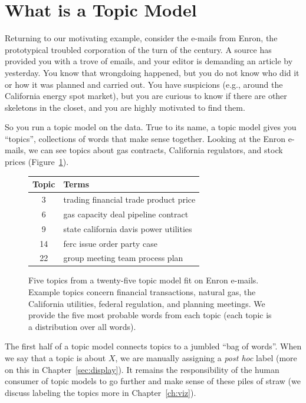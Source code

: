 \section{What is a Topic Model}

Returning to our motivating example, consider the e-mails from Enron, the prototypical
troubled corporation of the turn of the century.  A source has provided you with a trove of emails, and your editor is demanding an article by yesterday.  You know
that wrongdoing happened, but you do not know who did it or how it was planned
and carried out.  You have suspicions (e.g., around the California energy spot market),
but you are curious to know if there are other skeletons in the closet, and
you are highly motivated to find them.

So you run a topic model on the data.  True to its name, a topic model
gives you ``topics'', collections of words that make sense together.
Looking at the Enron e-mails, we can see topics about gas contracts,
California regulators, and stock prices
(Figure~\ref{fig:enron_topics}).

\begin{figure}
\begin{center}
\begin{tabular}{cp{10cm}}
\hline
\rowcolor{gray!50}
\hline
Topic & Terms \\
\hline \hline
3 & trading financial trade product price  \\
6 & gas capacity deal pipeline contract \\
9 & state california davis power utilities \\
14 & ferc issue order party case \\
22 & group meeting team process plan \\
\hline
\end{tabular}
\end{center}

  \caption{Five topics from a twenty-five topic model fit on Enron
    e-mails.  Example topics concern financial transactions, natural
    gas, the California utilities, federal regulation, and planning
    meetings.  We provide the five most probable words from each topic
  (each topic is a distribution over all words).}
  \label{fig:enron_topics}
\end{figure}

The first half of a topic model connects topics to a jumbled ``bag of words''.
When we say that a topic is about $X$, we are manually assigning a \textit{post hoc} label
 (more on this in Chapter~\ref{sec:display}).
It remains the responsibility of the human consumer of topic models to go further and
make sense of these piles of straw (we discuss labeling the topics
more in Chapter~\ref{ch:viz}).

